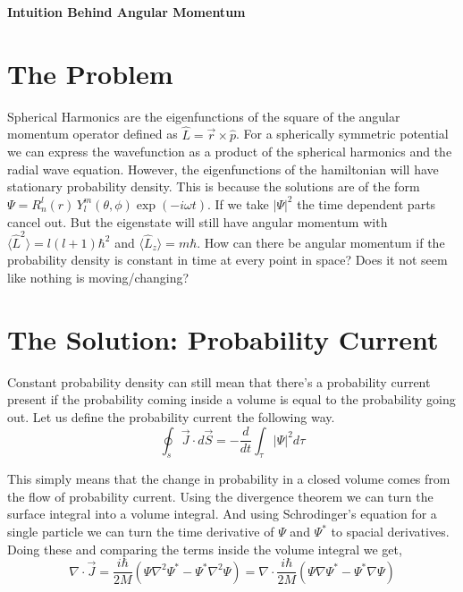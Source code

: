 \documentclass[a4paper, 12pt]{article}
\renewcommand{\indent}{\hspace{3ex}}
\renewcommand{\maketitle}{
	\begin{center}
		\Huge\bfseries{Intuition Behind Angular Momentum}
	\end{center}
	\bigskip
}
\begin{document}
\maketitle

\section{The Problem}
\indent Spherical Harmonics are the eigenfunctions of the square of the angular momentum operator defined as $ \hat L = \vec r \times \hat p$. For a spherically symmetric potential we can express the wavefunction as a product of the spherical harmonics and the radial wave equation. However, the eigenfunctions of the hamiltonian will have stationary probability density. This is because the solutions are of the form $\Psi = R_n^l (r) \, Y_l^m (\theta, \phi) \exp(-i \omega t)$. If we take $|\Psi|^2$ the time dependent parts cancel out. But the eigenstate will still have angular momentum with $\langle {\hat L}^2 \rangle = l (l+1) \hbar^2$ and $\langle \hat L_z \rangle = m \hbar$. How can there be angular momentum if the probability density is constant in time at every point in space? Does it not seem like nothing is moving/changing?

\section{The Solution: Probability Current}
\indent Constant probability density can still mean that there's a probability current present if the probability coming inside a volume is equal to the probability going out. Let us define the probability current the following way.
\begin{equation}
	\oint_s \vec J \cdot d\vec S = - \frac{d}{dt} \int_\tau |\Psi|^2 d\tau \label{definition of J}
\end{equation}

This simply means that the change in probability in a closed volume comes from the flow of probability current. Using the divergence theorem we can turn the surface integral into a volume integral. And using Schrodinger's equation for a single particle we can turn the time derivative of $\Psi$ and $\Psi^*$ to spacial derivatives. Doing these and comparing the terms inside the volume integral we get,
\begin{equation}
	\nabla \cdot \vec J = \frac{i \hbar}{2M} \left( \Psi \nabla^2 \Psi^* - \Psi^* \nabla^2 \Psi \right) = \nabla \cdot \frac{i \hbar}{2M} \left( \Psi \nabla\Psi^* - \Psi^* \nabla\Psi \right) \label{divergence of J}
\end{equation}
\end{document}
